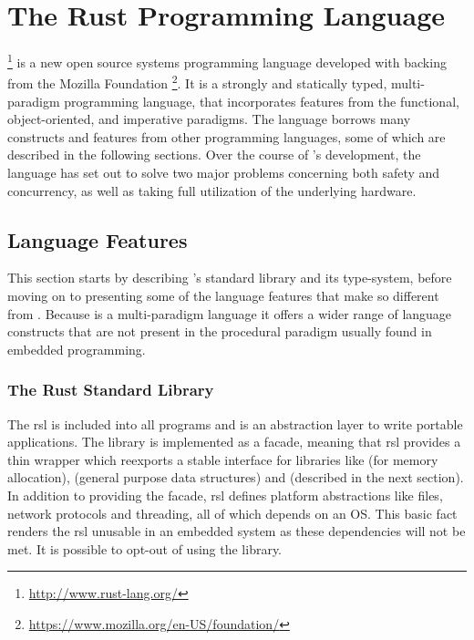 
\section{The Rust Programming Language} %
\label{sub:the_rust_programming_language}

{\rust} \footnote{\url{http://www.rust-lang.org/}} is a new open source systems programming language developed with backing from the Mozilla Foundation \footnote{\url{https://www.mozilla.org/en-US/foundation/}}.
It is a strongly and statically typed, multi-paradigm programming language, that incorporates features from the functional, object-oriented, and imperative paradigms.
The language borrows many constructs and features from other programming languages, some of which are described in the following sections.
Over the course of {\rust}'s development, the language has set out to solve two major problems concerning both safety and concurrency, as well as taking full utilization of the underlying hardware.

\subsection{Language Features}
\label{ssub:rust:features}

This section starts by describing {\rust}'s standard library and its type-system, before moving on to presenting some of the language features that make {\rust} so different from {\C}.
Because {\rust} is a multi-paradigm language it offers a wider range of language constructs that are not present in the procedural paradigm usually found in embedded programming.

\subsubsection{The Rust Standard Library}
\label{sec:rsl}

The \gls{rsl} is included into all {\rust} programs and is an abstraction layer to write portable applications.
The library is implemented as a facade, meaning that \gls{rsl} provides a thin wrapper which reexports a stable interface for libraries like  (for memory allocation),  (general purpose data structures) and {\core} (described in the next section).
In addition to providing the facade, \gls{rsl} defines platform abstractions like files, network protocols and threading, all of which depends on an OS.
This basic fact renders the \gls{rsl} unusable in an embedded system as these dependencies will not be met.
It is possible to opt-out of using the library.

